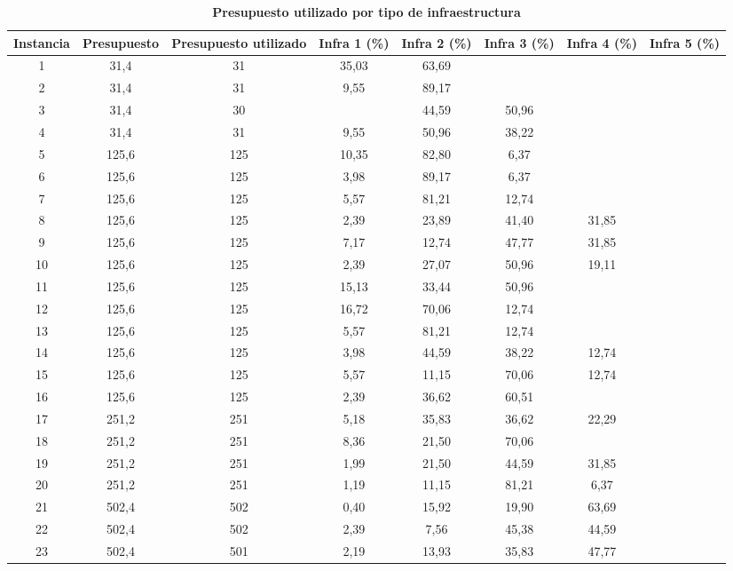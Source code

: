 \documentclass{article}
\begin{document}
  \begin{table}
    \centering
    \caption*{{\bf Presupuesto utilizado por tipo de infraestructura}}
    \begin{tabular}{cccccccc}
        \toprule
        Instancia & Presupuesto & Presupuesto utilizado & Infra 1 (\%) & Infra 2 (\%) & Infra 3 (\%) & Infra 4 (\%) & Infra 5 (\%) \\
        \midrule
        1 & 31,4 & 31 & 35,03 & 63,69 &  &  &  \\
        2 & 31,4 & 31 & 9,55 & 89,17 &  &  &  \\
        3 & 31,4 & 30 &  & 44,59 & 50,96 &  &  \\
        4 & 31,4 & 31 & 9,55 & 50,96 & 38,22 &  &  \\
        5 & 125,6 & 125 & 10,35 & 82,80 & 6,37 &  &  \\
        6 & 125,6 & 125 & 3,98 & 89,17 & 6,37 &  &  \\
        7 & 125,6 & 125 & 5,57 & 81,21 & 12,74 &  &  \\
        8 & 125,6 & 125 & 2,39 & 23,89 & 41,40 & 31,85 &  \\
        9 & 125,6 & 125 & 7,17 & 12,74 & 47,77 & 31,85 &  \\
        10 & 125,6 & 125 & 2,39 & 27,07 & 50,96 & 19,11 &  \\
        11 & 125,6 & 125 & 15,13 & 33,44 & 50,96 &  &  \\
        12 & 125,6 & 125 & 16,72 & 70,06 & 12,74 &  &  \\
        13 & 125,6 & 125 & 5,57 & 81,21 & 12,74 &  &  \\
        14 & 125,6 & 125 & 3,98 & 44,59 & 38,22 & 12,74 &  \\
        15 & 125,6 & 125 & 5,57 & 11,15 & 70,06 & 12,74 &  \\
        16 & 125,6 & 125 & 2,39 & 36,62 & 60,51 &  &  \\
        17 & 251,2 & 251 & 5,18 & 35,83 & 36,62 & 22,29 &  \\
        18 & 251,2 & 251 & 8,36 & 21,50 & 70,06 &  &  \\
        19 & 251,2 & 251 & 1,99 & 21,50 & 44,59 & 31,85 &  \\
        20 & 251,2 & 251 & 1,19 & 11,15 & 81,21 & 6,37 &  \\
        21 & 502,4 & 502 & 0,40 & 15,92 & 19,90 & 63,69 &  \\
        22 & 502,4 & 502 & 2,39 & 7,56 & 45,38 & 44,59 &  \\
        23 & 502,4 & 501 & 2,19 & 13,93 & 35,83 & 47,77 &  \\

\end{tabular}
\end{table}
\end{document}
